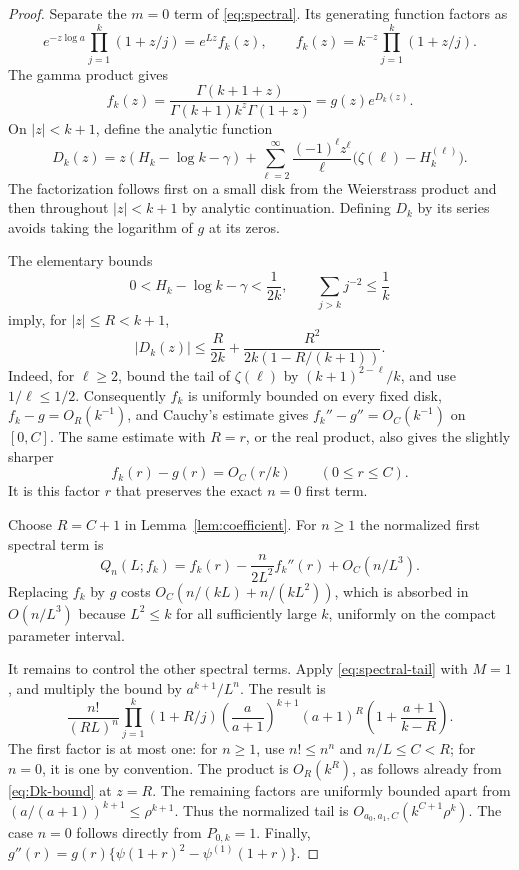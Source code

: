 \begin{proof}
Separate the \(m=0\) term of \eqref{eq:spectral}. Its generating
function factors as
\[
e^{-z\log a}\prod_{j=1}^k(1+z/j)=e^{Lz}f_k(z),
\qquad
f_k(z)=k^{-z}\prod_{j=1}^k(1+z/j).
\]
The gamma product gives
\[
f_k(z)=\frac{\Gamma(k+1+z)}
 {\Gamma(k+1)k^z\Gamma(1+z)}
      =g(z)e^{D_k(z)}.
\]
On \(|z|<k+1\), define the analytic function
\begin{equation}\label{eq:Dk}
D_k(z)=z(H_k-\log k-\gamma)
 +\sum_{\ell=2}^{\infty}
   \frac{(-1)^\ell z^\ell}{\ell}
       \bigl(\zeta(\ell)-H_k^{(\ell)}\bigr).
\end{equation}
The factorization follows first on a small disk from the
Weierstrass product and then throughout \(|z|<k+1\) by analytic
continuation. Defining \(D_k\) by its series avoids taking the
logarithm of \(g\) at its zeros.

The elementary bounds
\[
0<H_k-\log k-\gamma<\frac1{2k},\qquad
\sum_{j>k}j^{-2}\le\frac1k
\]
imply, for \(|z|\le R<k+1\),
\begin{equation}\label{eq:Dk-bound}
|D_k(z)|\le\frac{R}{2k}
   +\frac{R^2}{2k(1-R/(k+1))}.
\end{equation}
Indeed, for \(\ell\ge2\), bound the tail of \(\zeta(\ell)\) by
\((k+1)^{2-\ell}/k\), and use \(1/\ell\le1/2\).
Consequently \(f_k\) is uniformly bounded on every fixed disk,
\(f_k-g=O_R(k^{-1})\), and Cauchy's estimate gives
\(f_k''-g''=O_C(k^{-1})\) on \([0,C]\).
The same estimate with \(R=r\), or the real product, also gives the
slightly sharper
\[
f_k(r)-g(r)=O_C(r/k)\qquad(0\le r\le C).
\]
It is this factor \(r\) that preserves the exact \(n=0\) first term.

Choose \(R=C+1\) in Lemma~\ref{lem:coefficient}. For \(n\ge1\)
the normalized first spectral term is
\[
Q_n(L;f_k)
=f_k(r)-\frac{n}{2L^2}f_k''(r)+O_C(n/L^3).
\]
Replacing \(f_k\) by \(g\) costs
\(O_C(n/(kL)+n/(kL^2))\), which is absorbed in \(O(n/L^3)\)
because \(L^2\le k\) for all sufficiently large \(k\), uniformly
on the compact parameter interval.

It remains to control the other spectral terms. Apply
\eqref{eq:spectral-tail} with \(M=1\), and multiply the bound by
\(a^{k+1}/L^n\). The result is
\[
\frac{n!}{(RL)^n}\prod_{j=1}^k(1+R/j)
\left(\frac{a}{a+1}\right)^{k+1}(a+1)^R
\left(1+\frac{a+1}{k-R}\right).
\]
The first factor is at most one: for \(n\ge1\), use
\(n!\le n^n\) and \(n/L\le C<R\); for \(n=0\), it is one by
convention. The product is \(O_R(k^R)\), as follows already from
\eqref{eq:Dk-bound} at \(z=R\).
The remaining factors are uniformly bounded apart from
\((a/(a+1))^{k+1}\le\rho^{k+1}\). Thus the normalized tail is
\(O_{a_0,a_1,C}(k^{C+1}\rho^k)\). The case \(n=0\) follows
directly from \(P_{0,k}=1\).
Finally,
\(g''(r)=g(r)\{\psi(1+r)^2-\psi^{(1)}(1+r)\}\).
\end{proof}

